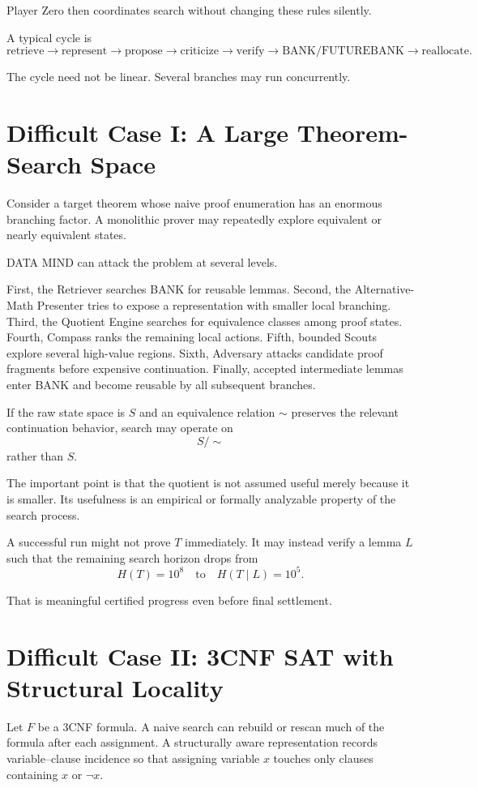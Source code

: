 \documentclass[11pt]{article}
\begin{document}
Player Zero then coordinates search without changing these rules silently.

A typical cycle is
\[
\text{retrieve}
\to
\text{represent}
\to
\text{propose}
\to
\text{criticize}
\to
\text{verify}
\to
\text{BANK/FUTUREBANK}
\to
\text{reallocate}.
\]

The cycle need not be linear. Several branches may run concurrently.

\section{Difficult Case I: A Large Theorem-Search Space}

Consider a target theorem whose naive proof enumeration has an enormous branching factor. A monolithic prover may repeatedly explore equivalent or nearly equivalent states.

DATA MIND can attack the problem at several levels.

First, the Retriever searches BANK for reusable lemmas. Second, the Alternative-Math Presenter tries to expose a representation with smaller local branching. Third, the Quotient Engine searches for equivalence classes among proof states. Fourth, Compass ranks the remaining local actions. Fifth, bounded Scouts explore several high-value regions. Sixth, Adversary attacks candidate proof fragments before expensive continuation. Finally, accepted intermediate lemmas enter BANK and become reusable by all subsequent branches.

If the raw state space is $S$ and an equivalence relation $\sim$ preserves the relevant continuation behavior, search may operate on
\[
S/{\sim}
\]
rather than $S$.

The important point is that the quotient is not assumed useful merely because it is smaller. Its usefulness is an empirical or formally analyzable property of the search process.

A successful run might not prove $T$ immediately. It may instead verify a lemma $L$ such that the remaining search horizon drops from
\[
H(T)=10^8
\quad\text{to}\quad
H(T\mid L)=10^5.
\]

That is meaningful certified progress even before final settlement.

\section{Difficult Case II: 3CNF SAT with Structural Locality}

Let $F$ be a 3CNF formula. A naive search can rebuild or rescan much of the formula after each assignment. A structurally aware representation records variable--clause incidence so that assigning variable $x$ touches only clauses containing $x$ or $\neg x$.
\end{document}
